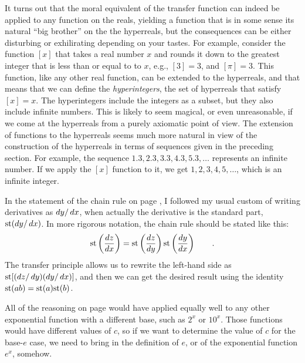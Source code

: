 It turns out that the moral equivalent of the  transfer function can indeed be applied to any function on
the reals, yielding a function that is in some sense its natural ``big brother'' on the the hyperreals, but the consequences can be
either disturbing or exhilirating depending on your tastes.
 For example, consider the function $[x]$ that takes
a real number $x$ and rounds it down to the greatest integer that is less than or equal to to $x$, e.g.,
$[3]=3$, and $[\pi]=3$. This function, like any other real function,
can be extended to the hyperreals, and that means that we can define
the \emph{hyperintegers},
the set of hyperreals that satisfy $[x]=x$. The hyperintegers include the integers as a subset,
but they also include infinite numbers. This is likely to seem magical, or even unreasonable, if we come
at the hyperreals from a purely axiomatic point of view.
The extension of functions to the hyperreals seems much more natural in view of the
construction of the hyperreals in terms of sequences given in the preceding section. For example,
the sequence $1.3, 2.3, 3.3, 4.3, 5.3, \ldots$ represents an infinite number. If we apply the $[x]$
function to it, we get $1, 2, 3, 4, 5, \ldots$, which is an infinite integer.


In the statement of the chain rule on page \pageref{sec:chain-rule}, I followed my usual custom of writing
derivatives as $\mathop{d\!} y/\mathop{d\!} x$, when actually the derivative is the standard part, $\textup{st}(\mathop{d\!} y/\mathop{d\!} x)$. In more rigorous
notation, the chain rule should be stated like this:
\begin{equation*}
  \textup{st}\left(\frac{\mathop{d\!} z}{\mathop{d\!} x}\right) =   \textup{st}\left(\frac{\mathop{d\!} z}{\mathop{d\!} y}\right) \textup{st}\left(\frac{\mathop{d\!} y}{\mathop{d\!} x}\right) \qquad .
\end{equation*}
The transfer principle allows us to rewrite the left-hand side as $\textup{st}[(\mathop{d\!} z/\mathop{d\!} y)(\mathop{d\!} y/\mathop{d\!} x)]$, and then
we can get the desired result using the identity $\textup{st}(ab)=\textup{st}(a)\textup{st}(b)$.


All of the reasoning on page \pageref{main:exp} would have applied equally well to any other
exponential function with a different base, such as $2^x$ or $10^x$. Those functions would have
different values of $c$, so if we want to determine the value of $c$ for the base-$e$ case, we
need to bring in the definition of $e$, or of the exponential function $e^x$, somehow.

